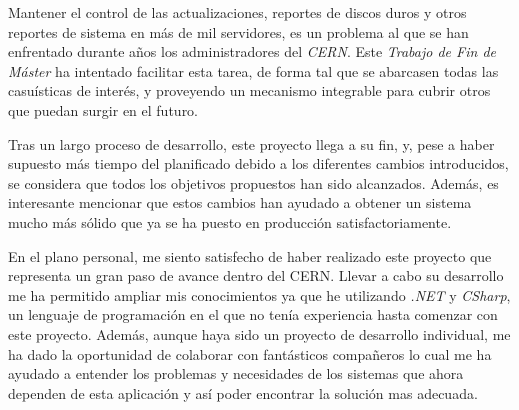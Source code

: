 
    Mantener el control de las actualizaciones, reportes de discos duros y otros reportes de sistema en más de mil servidores, es un problema al que se han enfrentado durante años los administradores del \textit{CERN}. Este \textit{Trabajo de Fin de Máster} ha intentado facilitar esta tarea, de forma tal que se abarcasen todas las casuísticas de interés, y proveyendo un mecanismo integrable para cubrir otros que puedan surgir en el futuro.
    
    Tras un largo proceso de desarrollo, este proyecto llega a su fin, y, pese a haber supuesto más tiempo del planificado debido a los diferentes cambios introducidos, se considera que todos los objetivos propuestos han sido alcanzados. Además, es interesante mencionar que estos cambios han ayudado a obtener un sistema mucho más sólido que ya se ha puesto en producción satisfactoriamente.
    
    En el plano personal, me siento satisfecho de haber realizado este proyecto que representa un gran paso de avance dentro del CERN. Llevar a cabo su desarrollo me ha permitido ampliar mis conocimientos ya que he utilizando \textit{.NET} y \textit{CSharp}, un lenguaje de programación en el que no tenía experiencia  hasta comenzar con este proyecto. Además, aunque haya sido un proyecto de desarrollo individual, me ha dado la oportunidad de colaborar con fantásticos compañeros lo cual me ha ayudado a entender los problemas y necesidades de los sistemas que ahora dependen de esta aplicación y así poder encontrar la solución mas adecuada.
